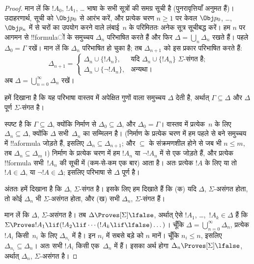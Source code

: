 \documentclass[../../../include/open-logic-section]{subfiles}
\begin{document}
\begin{proof}
मान लें कि $!A_0$, $!A_1$, \dots{} भाषा के सभी सूत्रों की समग्र सूची है
(पुनरावृत्तियाँ अनुमत हैं)। उदाहरणार्थ, सूची को $\Obj p_0$ से आरंभ करें,
और प्रत्येक चरण $n \ge 1$ पर केवल $\Obj p_0$, \dots,~$\Obj p_n$ में से
चरों का उपयोग करने वाले लंबाई~$n$ के परिमिततः अनेक सूत्र सूचीबद्ध करें।
हम $n$ पर आगमन से !!{formula}ों के समुच्चय $\Delta_n$ परिभाषित करते हैं और
फिर $\Delta = \bigcup_n \Delta_n$ रखते हैं। पहले $\Delta_0 = \Gamma$
रखें। मान लें कि $\Delta_n$ परिभाषित हो चुका है; तब $\Delta_{n+1}$ को इस
प्रकार परिभाषित करते हैं:
\[
\Delta_{n+1} =
\begin{cases}
  \Delta_n \cup \{!A_n\}, & \text{यदि $\Delta_n \cup \{ !A_n\}$
    $\Sigma$-संगत है;} \\
  \Delta_n \cup \{ \lnot !A_n\}, & \text{अन्यथा।}
\end{cases}
\]
अब $\Delta = \bigcup_{n=0}^\infty \Delta_n$ रखें।

हमें दिखाना है कि यह परिभाषा वास्तव में अपेक्षित गुणों वाला समुच्चय
$\Delta$ देती है, अर्थात् $\Gamma \subseteq \Delta$ और $\Delta$ पूर्ण
$\Sigma$-संगत है।

स्पष्ट है कि $\Gamma \subseteq \Delta$, क्योंकि निर्माण से $\Delta_0
\subseteq \Delta$, और $\Delta_0 = \Gamma$। वास्तव में प्रत्येक~$n$ के
लिए $\Delta_n \subseteq \Delta$, क्योंकि $\Delta$ सभी~$\Delta_n$ का
सम्मिलन है। (निर्माण के प्रत्येक चरण में हम पहले से बने समुच्चय में
!!a{formula} जोड़ते हैं, इसलिए $\Delta_n \subseteq \Delta_{n+1}$; और
$\subseteq$ के संक्रमणशील होने से जब भी $n \le m$, तब $\Delta_n
\subseteq \Delta_m$।) निर्माण के प्रत्येक चरण में हम $!A_n$ या $\lnot
!A_n$ में से एक जोड़ते हैं, और प्रत्येक !!{formula} सभी~$!A_n$ की सूची में
(कम-से-कम एक बार) आता है। अतः प्रत्येक $!A$ के लिए या तो $!A \in
\Delta$, या $\lnot !A \in \Delta$; इसलिए परिभाषा से $\Delta$ पूर्ण है।

अंततः हमें दिखाना है कि $\Delta$, $\Sigma$-संगत है। इसके लिए हम दिखाते
हैं कि (क) यदि $\Delta$, $\Sigma$-असंगत होता, तो कोई $\Delta_n$ भी
$\Sigma$-असंगत होता, और (ख) सभी $\Delta_n$, $\Sigma$-संगत हैं।

मान लें कि $\Delta$, $\Sigma$-असंगत है। तब $\Delta \Proves[\Sigma]
\lfalse$, अर्थात् ऐसे $!A_1$, \dots,~$!A_k \in \Delta$ हैं कि $\Sigma
\Proves !A_1 \lif (!A_2 \lif \cdots (!A_k \lif \lfalse)\dots)$। चूँकि
$\Delta = \bigcup_{n=0}^\infty \Delta_n$, प्रत्येक $!A_i$ किसी~$n_i$ के
लिए $\Delta_{n_i}$ में है। इन $n_i$ में सबसे बड़े को $n$ मानें। चूँकि
$n_i \le n$, इसलिए $\Delta_{n_i} \subseteq \Delta_n$। अतः सभी $!A_i$
किसी एक~$\Delta_n$ में हैं। इसका अर्थ होगा $\Delta_n \Proves[\Sigma]
\lfalse$, अर्थात् $\Delta_n$, $\Sigma$-असंगत है।


\end{proof}
\end{document}
